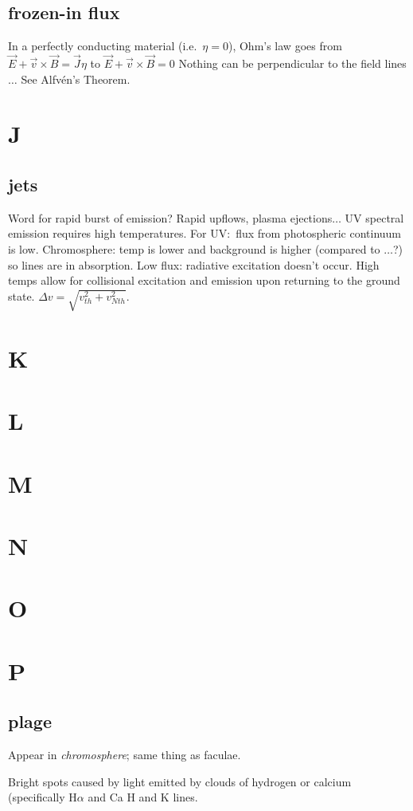 \documentclass[12pt]{article}
\begin{document}
\subsection*{frozen-in flux}
In a perfectly conducting material (i.e.\ $\eta = 0$),
Ohm's law goes from
$ \vec{E} + \vec{v} \times \vec{B} = \vec{J}\eta $ to
$ \vec{E} + \vec{v} \times \vec{B} = 0 $
Nothing can be perpendicular to the field lines $\ldots$
See Alfv\'en's Theorem.

\section{J}
\subsection*{jets}
Word for rapid burst of emission? Rapid upflows, plasma
ejections$\ldots$ UV spectral emission requires high temperatures.
For UV:\ flux from photospheric continuum is low. Chromosphere:
temp is lower and background is higher (compared to $\ldots$?)
so lines are in absorption. Low flux: radiative excitation doesn't occur.
High temps allow for collisional excitation and emission upon returning
to the ground state. $\Delta v = \sqrt{v_{th}^2+v_{Nth}^2}$.

\section{K}
\section{L}
\section{M}
\section{N}
\section{O}

\section{P}
\subsection*{plage}
    \begin{itemize*}
        \item Appear in \emph{chromosphere}; same thing as faculae.
        \item Bright spots caused by light emitted by clouds of
            hydrogen or calcium (specifically H$\alpha$ and
            Ca H and K lines.
    \end{itemize*}
\end{document}
